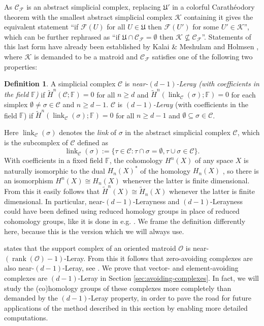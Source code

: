 \documentclass[a4paper,11pt,reqno, english]{amsart}
\theoremstyle{definition}
\newtheorem{definition}[theorem]{Definition}
\theoremstyle{remark}
\DeclareMathOperator{\link}{\mathrm{link}}
\begin{document}
As $\mathscr{C}_\mathcal{F}$ is an abstract simplicial complex, replacing $\mathfrak{U}'$ in a colorful Carath\'eodory theorem with the smallest abstract simplicial complex $\mathscr{K}$ containing it gives the equivalent statement ``if $\mathcal{F}(U)$ for all $U\in\mathfrak{U}$ then $\mathcal{F}(U')$ for some $U'\in\mathscr{K}$'', which can be further rephrased as ``if $\mathfrak{U}\cap\mathscr{C}_\mathcal{F}=\emptyset$ then $\mathscr{K}\nsubseteq\mathscr{C}_\mathcal{F}$''. Statements of this last form have already been established by Kalai \& Meshulam \cite[Theorem 1.6]{KalaiMeshulam2005} and Holmsen \cite[Theorem 1.4]{Holmsen2016}, where $\mathscr{K}$ is demanded to be a matroid and $\mathscr{C}_\mathcal{F}$ satisfies one of the following two properties:
\begin{definition}
    A simplicial complex $\mathscr{C}$ is \emph{near-$(d-1)$-Leray (with coefficients in the field $\mathbb{F}$)} if $\tilde{H}^n(\mathscr{C};\mathbb{F})=0$ for all $n\geq d$ and $\tilde{H}^n(\link_{\mathscr{C}}(\sigma);\mathbb{F})=0$ for each simplex $\emptyset\neq\sigma\in\mathscr{C}$ and $n\geq d-1$. $\mathscr{C}$ is \emph{$(d-1)$-Leray} (with coefficients in the field $\mathbb{F}$) if $\tilde{H}^n(\link_{\mathscr{C}}(\sigma);\mathbb{F})=0$ for all $n\geq d-1$ and $\emptyset\subseteq\sigma\in\mathscr{C}$.
\end{definition}
Here $\link_{\mathscr{C}}(\sigma)$ denotes the \emph{link} of $\sigma$ in the abstract simplicial complex $\mathscr{C}$, which is the subcomplex of $\mathscr{C}$ defined as
\[
    \link_{\mathscr{C}}(\sigma):=\{\tau\in\mathscr{C}:\tau\cap\sigma=\emptyset,\tau\cup\sigma\in\mathscr{C}\}.
\]
With coefficients in a fixed field $\mathbb{F}$, the cohomology $H^n(X)$ of any space $X$ is naturally isomorphic to the dual $H_n(X)^*$ of the homology $H_n(X)$ \cite[Corollary 53.6]{Munkres1984}, so there is an isomorphism $H^n(X)\cong H_n(X)$ whenever the latter is finite dimensional. From this it easily follows that $\tilde{H}^n(X)\cong\tilde{H}_n(X)$ whenever the latter is finite dimensional. In particular, near-$(d-1)$-Lerayness and $(d-1)$-Lerayness could have been defined using reduced homology groups in place of reduced cohomology groups, like it is done in e.g. \cite{Holmsen2016}. We frame the definition differently here, because this is the version which we will always use.

\cite[Proposition 1.3]{Holmsen2016} states that the support complex of an oriented matroid $\mathscr{O}$ is near-$(\operatorname{rank}(\mathscr{O})-1)$-Leray. From this it follows that zero-avoiding complexes are also near-$(d-1)$-Leray, see \cite[p. 4]{Holmsen2016}. We prove that vector- and element-avoiding complexes are $(d-1)$-Leray in Section \ref{sec:avoiding-complexes}. In fact, we will study the (co)homology groups of these complexes more completely than demanded by the $(d-1)$-Leray property, in order to pave the road for future applications of the method described in this section by enabling more detailed computations.
\end{document}
